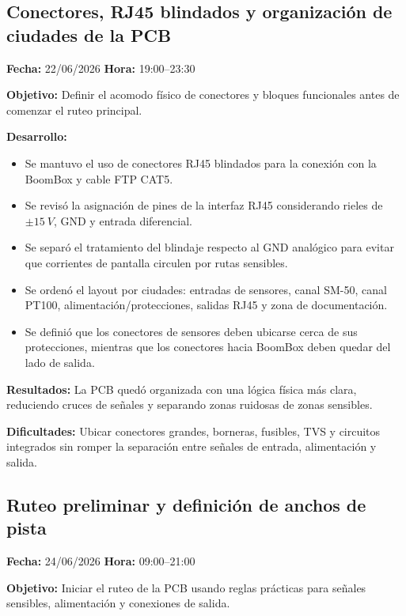 \documentclass[12pt]{article}
\begin{document}
\subsection{Conectores, RJ45 blindados y organización de ciudades de la PCB}
\textbf{Fecha:} 22/06/2026 \quad \textbf{Hora:} 19:00--23:30

\textbf{Objetivo:}
Definir el acomodo físico de conectores y bloques funcionales antes de comenzar el ruteo principal.

\textbf{Desarrollo:}
\begin{itemize}
\item Se mantuvo el uso de conectores RJ45 blindados para la conexión con la BoomBox y cable FTP CAT5.
\item Se revisó la asignación de pines de la interfaz RJ45 considerando rieles de \(\pm\SI{15}{V}\), GND y entrada diferencial.
\item Se separó el tratamiento del blindaje respecto al GND analógico para evitar que corrientes de pantalla circulen por rutas sensibles.
\item Se ordenó el layout por ciudades: entradas de sensores, canal SM-50, canal PT100, alimentación/protecciones, salidas RJ45 y zona de documentación.
\item Se definió que los conectores de sensores deben ubicarse cerca de sus protecciones, mientras que los conectores hacia BoomBox deben quedar del lado de salida.
\end{itemize}

\textbf{Resultados:}
La PCB quedó organizada con una lógica física más clara, reduciendo cruces de señales y separando zonas ruidosas de zonas sensibles.

\textbf{Dificultades:}
Ubicar conectores grandes, borneras, fusibles, TVS y circuitos integrados sin romper la separación entre señales de entrada, alimentación y salida.

\subsection{Ruteo preliminar y definición de anchos de pista}
\textbf{Fecha:} 24/06/2026 \quad \textbf{Hora:} 09:00--21:00

\textbf{Objetivo:}
Iniciar el ruteo de la PCB usando reglas prácticas para señales sensibles, alimentación y conexiones de salida.
\end{document}
